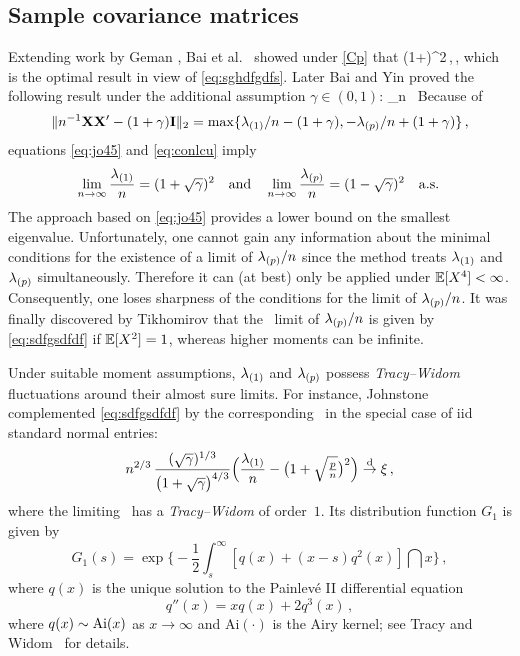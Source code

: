 \subsection{Sample covariance matrices}
Extending work by Geman \cite{geman},
Bai et al.~\cite{bai:yin:krishnaiah:1988} 
showed under \eqref{Cp} that
\beam\label{eq:gemanch1}
 \stas \big(1+\sqrt{\gamma}\big)^2\,,\qquad \nto\,,
\eeam
which is the optimal result in view of \eqref{eq:sghdfgdfs}. Later Bai and Yin \cite{bai:yin:1993} proved the following result under the additional assumption $\gamma\in (0,1)$:
\beam\label{eq:jo45}
\limsup_{n\to \infty}   \sqrt{\gamma}\,\quad \as
\eeam
Because of 
\begin{equation*}
\|n^{-1} {\mathbf X}{\mathbf X}'-(1+\gamma) {\mathbf I}\|_2 = \max \{ \lambda_{(1)}/n- (1+\gamma), -\lambda_{(p)}/n+(1+\gamma)\}\,,
\end{equation*}
equations \eqref{eq:jo45} and \eqref{eq:conlcu} imply 
\begin{equation}\label{eq:sdfgsdfdf}
\lim_{n\to \infty}\frac{\lambda_{(1)}}{n} = (1+\sqrt{\gamma})^2\quad \mbox{and}\quad
\lim_{n\to \infty}\frac{\lambda_{(p)}}{n} = (1-\sqrt{\gamma})^2\quad {\rm a.s.} \,
\end{equation}
The approach based on \eqref{eq:jo45} provides a lower bound on the smallest eigenvalue. Unfortunately, one cannot gain any information about the minimal conditions for the existence of a limit of $\lambda_{(p)}/n$ since the method treats $\lambda_{(1)}$ and $\lambda_{(p)}$ simultaneously. Therefore it can (at best) only be applied under $\mathbb{E}[X^4]<\infty$. Consequently, one loses sharpness of the conditions for the limit of $\lambda_{(p)}/n$. It was finally discovered by Tikhomirov \cite{tikhomirov:2015} that the \as~limit of $ \lambda_{(p)}/n$ is given by \eqref{eq:sdfgsdfdf} if $\mathbb{E}[X^2]=1$, whereas higher moments can be infinite.
\par

Under suitable moment assumptions, $\lambda_{(1)}$ and $\lambda_{(p)}$ possess {\em Tracy--Widom} fluctuations around their almost sure limits. For instance, 
Johnstone \cite{johnstone:2001} complemented \eqref{eq:sdfgsdfdf} by the corresponding \clt\ in the special case of iid standard normal 
entries:
\begin{equation*}%
 n^{2/3}\,\dfrac{(\sqrt{\gamma})^{1/3}}{\big(1+\sqrt{\gamma}\big)^{4/3}}\Big(\dfrac {\la_{(1)}}{n} -
\big(1+\sqrt{\tfrac pn }\big)^2\Big)
\std \xi\,,
\end{equation*}
where the limiting \rv\ has a {\em Tracy--Widom \ds} of order~$1$.
Its distribution function $G_1$ is given by
\begin{equation*}
G_1(s) = \exp\Big\{
  -\frac{1}{2} \int_{s}^\infty [
    q(x) + (x - s) q^2(x)
 ] \dint x
\Big\}\,,
\end{equation*}
where $q(x)$ is the unique solution to the Painlev\'e II differential
equation
\begin{equation*}
  q''(x) = xq(x) + 2 q^3(x)\,,
\end{equation*}
where $ q(x)\sim {\rm Ai}(x)$ as $x \to \infty$ and Ai$(\cdot)$ is the Airy kernel; see Tracy and Widom~\cite{tracy:widom:2012} for details.

